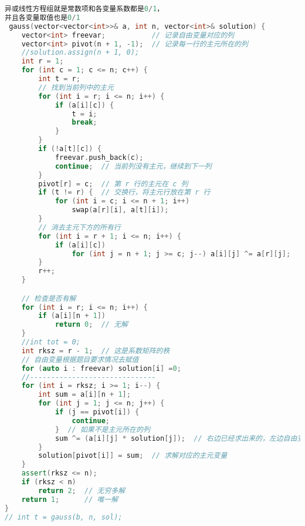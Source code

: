 \begin{lstlisting}[language=C++]
异或线性方程组就是常数项和各变量系数都是0/1，
并且各变量取值也是0/1
 gauss(vector<vector<int>>& a, int n, vector<int>& solution) {
    vector<int> freevar;           // 记录自由变量对应的列
    vector<int> pivot(n + 1, -1);  // 记录每一行的主元所在的列
    //solution.assign(n + 1, 0);
    int r = 1;
    for (int c = 1; c <= n; c++) {
        int t = r;
        // 找到当前列中的主元
        for (int i = r; i <= n; i++) {
            if (a[i][c]) {
                t = i;
                break;
            }
        }
        if (!a[t][c]) {
            freevar.push_back(c);
            continue;  // 当前列没有主元，继续到下一列
        }
        pivot[r] = c;  // 第 r 行的主元在 c 列
        if (t != r) {  // 交换行，将主元行放在第 r 行
            for (int i = c; i <= n + 1; i++)
                swap(a[r][i], a[t][i]);
        }
        // 消去主元下方的所有行
        for (int i = r + 1; i <= n; i++) {
            if (a[i][c])
                for (int j = n + 1; j >= c; j--) a[i][j] ^= a[r][j];
        }
        r++;
    }

    // 检查是否有解
    for (int i = r; i <= n; i++) {
        if (a[i][n + 1])
            return 0;  // 无解
    }
    //int tot = 0;
    int rksz = r - 1;  // 这是系数矩阵的秩
    // 自由变量根据题目要求情况去赋值
    for (auto i : freevar) solution[i] =0;
    //------------------------------
    for (int i = rksz; i >= 1; i--) {
        int sum = a[i][n + 1];
        for (int j = 1; j <= n; j++) {
            if (j == pivot[i]) {
                continue;
            }  // 如果不是主元所在的列
            sum ^= (a[i][j] * solution[j]);  // 右边已经求出来的，左边自由变量遗留
        }
        solution[pivot[i]] = sum;  // 求解对应的主元变量
    }
    assert(rksz <= n);
    if (rksz < n)
        return 2;  // 无穷多解
    return 1;      // 唯一解
}
// int t = gauss(b, n, sol);
\end{lstlisting}
